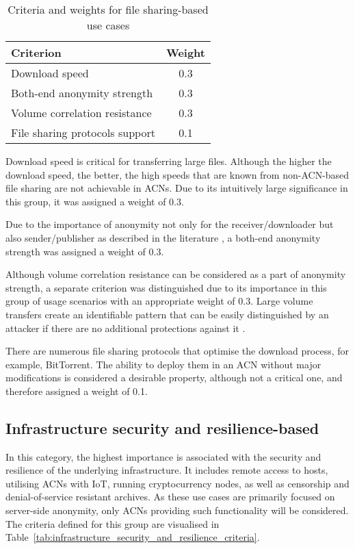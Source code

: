 \begin{table}[!ht]
\centering
\caption{Criteria and weights for file sharing-based use cases}
\begin{tabular}{|l|c|}
\hline
\textbf{Criterion} & \textbf{Weight} \\
\hline
Download speed & 0.3 \\
Both-end anonymity strength & 0.3 \\
Volume correlation resistance & 0.3 \\
File sharing protocols support & 0.1 \\
\hline
\end{tabular}
\label{tab:file_sharing_criteria}
\end{table}

Download speed is critical for transferring large files. Although the higher the download speed, the better, the high speeds that are known from non-ACN-based file sharing are not achievable in ACNs. Due to its intuitively large significance in this group, it was assigned a weight of 0.3.

Due to the importance of anonymity not only for the receiver/downloader but also sender/publisher as described in the literature \cite{rewebber, freehaven}, a both-end anonymity strength was assigned a weight of 0.3.

Although volume correlation resistance can be considered as a part of anonymity strength, a separate criterion was distinguished due to its importance in this group of usage scenarios with an appropriate weight of 0.3. Large volume transfers create an identifiable pattern that can be easily distinguished by an attacker if there are no additional protections against it \cite{tor-design}.

There are numerous file sharing protocols that optimise the download process, for example, BitTorrent. The ability to deploy them in an ACN without major modifications is considered a desirable property, although not a critical one, and therefore assigned a weight of 0.1.

\subsection{Infrastructure security and resilience-based}
In this category, the highest importance is associated with the security and resilience of the underlying infrastructure. It includes remote access to hosts, utilising ACNs with IoT, running cryptocurrency nodes, as well as censorship and denial-of-service resistant archives. As these use cases are primarily focused on server-side anonymity, only ACNs providing such functionality will be considered. The criteria defined for this group are visualised in Table~\ref{tab:infrastructure_security_and_resilience_criteria}.

